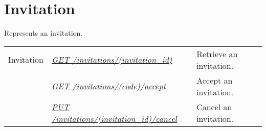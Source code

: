 \documentclass[letterpaper,10pt,english]{sphinxmanual}
\begin{document}
\section{Invitation}
\label{\detokenize{resources/invitation:invitation}}\label{\detokenize{resources/invitation::doc}}\label{\detokenize{resources/invitation:id1}}
Represents an invitation.

\noindent\begin{tabulary}{\linewidth}{|L|L|L|}
\hline
{}\relax &\relax &\relax \\
\hline
Invitation
&
{\hyperref[\detokenize{resources/invitation:get--invitations-(invitation_id)}]{\emph{GET /invitations/(invitation\_id)}}}
&
Retrieve an invitation.
\\
\hline&
{\hyperref[\detokenize{resources/invitation:get--invitations-(code)-accept}]{\emph{GET /invitations/(code)/accept}}}
&
Accept an invitation.
\\
\hline&
{\hyperref[\detokenize{resources/invitation:put--invitations-(invitation_id)-cancel}]{\emph{PUT /invitations/(invitation\_id)/cancel}}}
&
Cancel an invitation.
\\
\hline\end{tabulary}


\begin{DUlineblock}{0em}
\item[] 
\end{DUlineblock}
\end{document}

